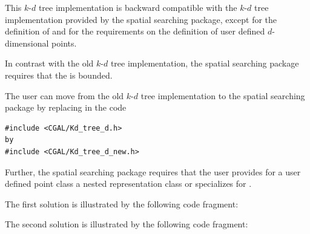 This $k$-$d$ tree implementation is backward compatible with the 
$k$-$d$ tree implementation provided by the spatial searching package,
except for the definition of  
and for the requirements on the definition of user defined $d$-dimensional points.

In contrast with the old $k$-$d$ tree implementation, the spatial searching package
requires that the  is bounded.

The user can move from the old $k$-$d$ tree implementation to the spatial searching package by
replacing in the code \\
\begin{verbatim}
#include <CGAL/Kd_tree_d.h>
by
#include <CGAL/Kd_tree_d_new.h>
\end{verbatim}
 
Further, the spatial searching package requires that the user provides for a user defined point class  
a nested representation
class  or specializes  for .

The first solution is illustrated by the following code fragment:


The second solution is illustrated by the following code fragment:

